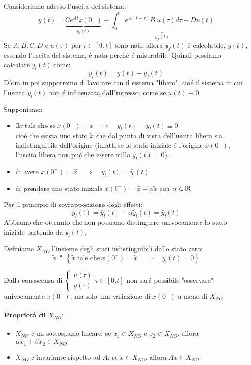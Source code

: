 \documentclass[../main.tex]{subfiles}
\begin{document}
		Consideriamo adesso l'uscita del sistema:
		\[
			y(t) = \underbrace{Ce^{At}x(0^{-})}_{y_l(t)} + \underbrace{\int_{0^{-}}^{t} e^{A(t-\tau)} B\ u(\tau) d\tau + Du(t)}_{y_f(t)}
		\]
		Se $ A, B, C, D $ e $ u(\tau) $ per $ \tau \in [0, t] $ sono noti, allora $ y_f(t) $ \'e calcolabile. $ y(t) $, essendo l'uscita del sistema, \'e nota perch\'e \'e misurabile. Quindi possiamo calcolare $ y_l(t) $ come:
		\[
			y_l(t) = y(t) - y_f(t)
		\]
		D'ora in poi supporremo di lavorare con il sistema "libero", cio\'e il sistema in cui l'uscita $ y_l(t) $ non \'e influenzata dall'ingresso, come se $ u(t) \equiv 0 $.
		\newline
		
		Supponiamo:
		\begin{itemize}
			\item
				$ \exists \tilde x\ \text{tale che se}\ x(0^{-}) = \tilde x \quad\Rightarrow\quad y_l(t) = \tilde y_l(t) \equiv 0 $\\
				cio\'e che esista uno stato $ \tilde x $ che dal punto di vista dell'uscita libera sia indistinguibile dall'origine (infatti se lo stato iniziale \'e l'origine $ x(0^{-}) $, l'uscita libera non pu\'o che essere nulla $ y_l(t) = 0 $).
			\item
				di avere $ x(0^{-}) = \hat x \quad\Rightarrow\quad y_l(t) = \hat y_l(t) $
			\item 
				di prendere uno stato iniziale $ x(0^{-}) = \hat x + \alpha \tilde x $ con $ \alpha \in \rm I\!R $
		\end{itemize}
		Per il principio di sovrapposizione degli effetti:
		\[
			y_l(t) = \hat y_l(t) + \alpha \tilde y_l(t) = \hat y_l(t)
		\]
		Abbiamo che ottenuto che non possiamo distinguere univocamente lo stato iniziale partendo da $ y_l(t) $.
		
		\begin{definition}
			Definiamo $ X_{NO} $ l'insieme degli stati indistinguibili dallo stato zero:
			\[
				\tilde x \triangleq \left\lbrace \tilde x\ \text{tale che}\ x(0^{-}) = \tilde x \quad\Rightarrow\quad y_l(t) = 0 \right\rbrace
			\]
		\end{definition}
	
		Dalla conoscenza di $ \begin{cases} u(\tau)\\ y(\tau) \end{cases} \tau \in [0,t] $ non sar\'a possibile "osservare" univocamente $ x(0^{-}) $, ma solo una variazione di $ x(0^{-}) $ a meno di $ X_{NO} $.
		
		\paragraph{Propriet\'a di $ X_{NO} $:}
			\begin{itemize}
				\item 
					$ X_{NO} $ \'e un sottospazio lineare: se $ \tilde x_1 \in X_{NO} $ e $ \tilde x_2 \in X_{NO} $, allora $ \alpha \tilde x_1 + \beta x_2 \in X_{NO} $
				\item 
					$ X_{NO} $ \'e invariante rispetto ad $ A $: se $ \tilde x \in X_{NO} $, allora $ A \tilde x \in X_{NO} $
			\end{itemize}
	
\end{document}
